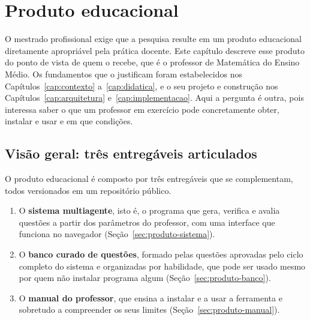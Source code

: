 \chapter{Produto educacional}
\label{cap:produto}


O mestrado profissional exige que a pesquisa resulte em um produto educacional diretamente
apropriável pela prática docente. Este capítulo descreve esse produto do ponto de vista de quem o
recebe, que é o professor de Matemática do Ensino Médio. Os fundamentos que o justificam foram
estabelecidos nos Capítulos~\ref{cap:contexto} a~\ref{cap:didatica}, e o seu projeto e construção
nos Capítulos~\ref{cap:arquitetura} e~\ref{cap:implementacao}. Aqui a pergunta é outra, pois
interessa saber o que um professor em exercício pode concretamente obter, instalar e usar e em que
condições.

\section{Visão geral: três entregáveis articulados}
\label{sec:produto-visao}

O produto educacional é composto por três entregáveis que se complementam, todos versionados em um
repositório público.

\begin{enumerate}
\item O \textbf{sistema multiagente}, isto é, o programa que gera, verifica e avalia questões a
  partir dos parâmetros do professor, com uma interface que funciona no navegador
  (Seção~\ref{sec:produto-sistema}).
\item O \textbf{banco curado de questões}, formado pelas questões aprovadas pelo ciclo completo do
  sistema e organizadas por habilidade, que pode ser usado mesmo por quem não instalar programa
  algum (Seção~\ref{sec:produto-banco}).
\item O \textbf{manual do professor}, que ensina a instalar e a usar a ferramenta e sobretudo a
  compreender os seus limites (Seção~\ref{sec:produto-manual}).
\end{enumerate}

